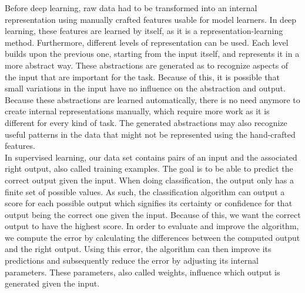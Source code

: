 \documentclass[a4paper]{article}
\begin{document}
Before deep learning, raw data had to be transformed into an internal representation using manually crafted features usable for model learners. In deep learning, these features are learned by itself, as it is a representation-learning method. Furthermore, different levels of representation can be used. Each level builds upon the previous one, starting from the input itself, and represents it in a more abstract way. These abstractions are generated as to recognize aspects of the input that are important for the task. Because of this, it is possible that small variations in the input have no influence on the abstraction and output. Because these abstractions are learned automatically, there is no need anymore to create internal representations manually, which require more work as it is different for every kind of task. The generated abstractions may also recognize useful patterns in the data that might not be represented using the hand-crafted features.\\


In supervised learning, our data set contains pairs of an input and the associated right output, also called training examples. The goal is to be able to predict the correct output given the input. When doing classification, the output only has a finite set of possible values. As such, the classification algorithm can output a score for each possible output which signifies its certainty or confidence for that output being the correct one given the input. Because of this, we want the correct output to have the highest score. In order to evaluate and improve the algorithm, we compute the error by calculating the differences between the computed output and the right output. Using this error, the algorithm can then improve its predictions and subsequently reduce the error by adjusting its internal parameters. These parameters, also called weights, influence which output is generated given the input.\\
\end{document}
